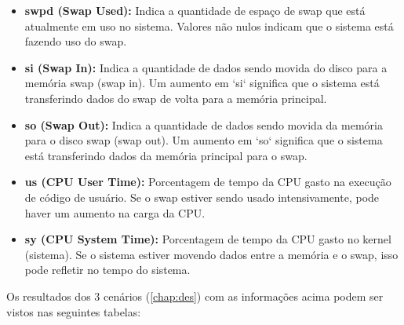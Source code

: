 \documentclass[
	12pt,				%
	openright,			%
	oneside,			%
	a4paper,			%
	chapter=TITLE,		%
	english,			%
	french,				%
	spanish,			%
	brazil				%
	]{abntex2}
\theoremstyle{definition}
\begin{document}
\begin{itemize}
    \item \textbf{swpd (Swap Used):} Indica a quantidade de espaço de swap que está atualmente em uso no sistema. Valores não nulos indicam que o sistema está fazendo uso do swap.

    \item \textbf{si (Swap In):} Indica a quantidade de dados sendo movida do disco para a memória swap (swap in). Um aumento em `si` significa que o sistema está transferindo dados do swap de volta para a memória principal.

    \item \textbf{so (Swap Out):} Indica a quantidade de dados sendo movida da memória para o disco swap (swap out). Um aumento em `so` significa que o sistema está transferindo dados da memória principal para o swap.

    \item \textbf{us (CPU User Time):} Porcentagem de tempo da CPU gasto na execução de código de usuário. Se o swap estiver sendo usado intensivamente, pode haver um aumento na carga da CPU.

    \item \textbf{sy (CPU System Time):} Porcentagem de tempo da CPU gasto no kernel (sistema). Se o sistema estiver movendo dados entre a memória e o swap, isso pode refletir no tempo do sistema.
\end{itemize}

Os resultados dos 3 cenários (\ref{chap:des}) com as informações acima podem ser vistos nas seguintes tabelas:
\end{document}
